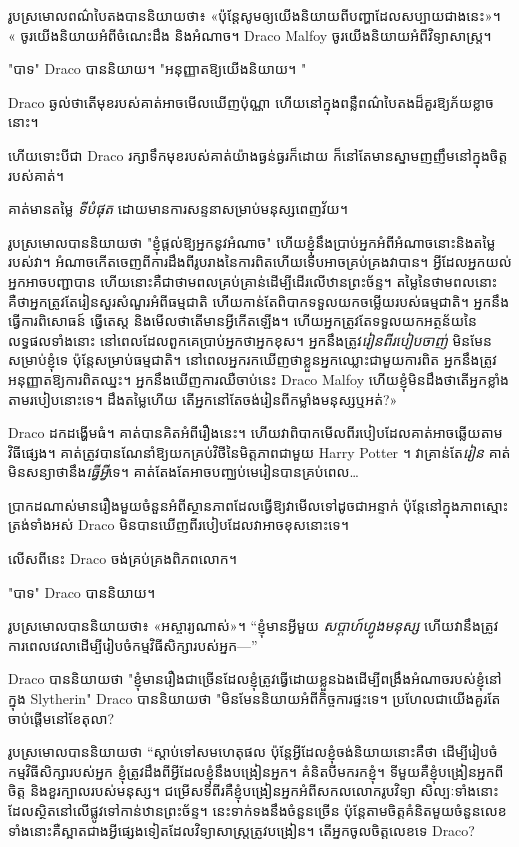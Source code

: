 {{រូប​ស្រមោល​ពណ៌​បៃតង​បាន​និយាយ​ថា៖ «ប៉ុន្តែ​សូម​ឲ្យ​យើង​និយាយ​ពី​បញ្ហា​ដែល​សប្បាយ​ជាង​នេះ»។ « ចូរ​យើង​និយាយ​អំពី​ចំណេះដឹង និង​អំណាច។ Draco Malfoy ចូរយើងនិយាយអំពីវិទ្យាសាស្ត្រ។

"បាទ" Draco បាននិយាយ។ "អនុញ្ញាតឱ្យយើងនិយាយ។ "

Draco ឆ្ងល់ថាតើមុខរបស់គាត់អាចមើលឃើញប៉ុណ្ណា ហើយនៅក្នុងពន្លឺពណ៌បៃតងដ៏គួរឱ្យភ័យខ្លាចនោះ។

ហើយទោះបីជា Draco រក្សាទឹកមុខរបស់គាត់យ៉ាងធ្ងន់ធ្ងរក៏ដោយ ក៏នៅតែមានស្នាមញញឹមនៅក្នុងចិត្តរបស់គាត់។

គាត់មានតម្លៃ \emph{ទីបំផុត} ដោយមានការសន្ទនាសម្រាប់មនុស្សពេញវ័យ។

រូបស្រមោលបាននិយាយថា "ខ្ញុំផ្តល់ឱ្យអ្នកនូវអំណាច" ហើយខ្ញុំនឹងប្រាប់អ្នកអំពីអំណាចនោះនិងតម្លៃរបស់វា។ អំណាច​កើត​ចេញ​ពី​ការ​ដឹង​ពី​រូបរាង​នៃ​ការ​ពិត​ហើយ​ទើប​អាច​គ្រប់គ្រង​វា​បាន។ អ្វីដែលអ្នកយល់ អ្នកអាចបញ្ជាបាន ហើយនោះគឺជាថាមពលគ្រប់គ្រាន់ដើម្បីដើរលើឋានព្រះច័ន្ទ។ តម្លៃនៃថាមពលនោះគឺថាអ្នកត្រូវតែរៀនសួរសំណួរអំពីធម្មជាតិ ហើយកាន់តែពិបាកទទួលយកចម្លើយរបស់ធម្មជាតិ។ អ្នកនឹងធ្វើការពិសោធន៍ ធ្វើតេស្ត និងមើលថាតើមានអ្វីកើតឡើង។ ហើយអ្នកត្រូវតែទទួលយកអត្ថន័យនៃលទ្ធផលទាំងនោះ នៅពេលដែលពួកគេប្រាប់អ្នកថាអ្នកខុស។ អ្នកនឹងត្រូវ\emph{រៀនពីរបៀបចាញ់} មិនមែនសម្រាប់ខ្ញុំទេ ប៉ុន្តែសម្រាប់ធម្មជាតិ។ នៅពេលអ្នករកឃើញថាខ្លួនអ្នកឈ្លោះជាមួយការពិត អ្នកនឹងត្រូវអនុញ្ញាតឱ្យការពិតឈ្នះ។ អ្នកនឹងឃើញការឈឺចាប់នេះ Draco Malfoy ហើយខ្ញុំមិនដឹងថាតើអ្នកខ្លាំងតាមរបៀបនោះទេ។ ដឹង​តម្លៃ​ហើយ តើ​អ្នក​នៅ​តែ​ចង់​រៀន​ពី​កម្លាំង​មនុស្ស​ឬ​អត់?»

Draco ដកដង្ហើមធំ។ គាត់បានគិតអំពីរឿងនេះ។ ហើយវាពិបាកមើលពីរបៀបដែលគាត់អាចឆ្លើយតាមវិធីផ្សេង។ គាត់​ត្រូវ​បាន​ណែនាំ​ឱ្យ​យក​គ្រប់​វិថី​នៃ​មិត្តភាព​ជាមួយ Harry Potter ។ វាគ្រាន់តែ\emph{រៀន} គាត់មិនសន្យាថានឹង\emph{ធ្វើអ្វី}ទេ។ គាត់តែងតែអាចបញ្ឈប់មេរៀនបានគ្រប់ពេល…

ប្រាកដណាស់មានរឿងមួយចំនួនអំពីស្ថានភាពដែលធ្វើឱ្យវាមើលទៅដូចជាអន្ទាក់ ប៉ុន្តែនៅក្នុងភាពស្មោះត្រង់ទាំងអស់ Draco មិនបានឃើញពីរបៀបដែលវាអាចខុសនោះទេ។

លើសពីនេះ Draco ចង់គ្រប់គ្រងពិភពលោក។

"បាទ" Draco បាននិយាយ។

រូប​ស្រមោល​បាន​និយាយ​ថា​៖ «​អស្ចារ្យ​ណាស់​»។ “ខ្ញុំមានអ្វីមួយ \emph{សប្តាហ៍ហ្វូងមនុស្ស} ហើយវានឹងត្រូវការពេលវេលាដើម្បីរៀបចំកម្មវិធីសិក្សារបស់អ្នក—”

Draco បាននិយាយថា "ខ្ញុំមានរឿងជាច្រើនដែលខ្ញុំត្រូវធ្វើដោយខ្លួនឯងដើម្បីពង្រឹងអំណាចរបស់ខ្ញុំនៅក្នុង Slytherin" Draco បាននិយាយថា "មិនមែននិយាយអំពីកិច្ចការផ្ទះទេ។ ប្រហែលជាយើងគួរតែចាប់ផ្តើមនៅខែតុលា?

រូបស្រមោលបាននិយាយថា “ស្តាប់ទៅសមហេតុផល ប៉ុន្តែអ្វីដែលខ្ញុំចង់និយាយនោះគឺថា ដើម្បីរៀបចំកម្មវិធីសិក្សារបស់អ្នក ខ្ញុំត្រូវដឹងពីអ្វីដែលខ្ញុំនឹងបង្រៀនអ្នក។ គំនិតបីមករកខ្ញុំ។ ទីមួយគឺខ្ញុំបង្រៀនអ្នកពីចិត្ត និងខួរក្បាលរបស់មនុស្ស។ ជម្រើសទីពីរគឺខ្ញុំបង្រៀនអ្នកអំពីសកលលោករូបវិទ្យា សិល្បៈទាំងនោះដែលស្ថិតនៅលើផ្លូវទៅកាន់ឋានព្រះច័ន្ទ។ នេះ​ទាក់​ទង​នឹង​ចំនួន​ច្រើន ប៉ុន្តែ​តាម​ចិត្ត​គំនិត​មួយ​ចំនួន​លេខ​ទាំង​នោះ​គឺ​ស្អាត​ជាង​អ្វី​ផ្សេង​ទៀត​ដែល​វិទ្យាសាស្ត្រ​ត្រូវ​បង្រៀន។ តើអ្នកចូលចិត្តលេខទេ Draco?

}}
